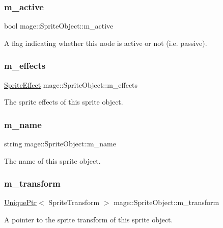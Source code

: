 \subsubsection{\texorpdfstring{m\+\_\+active}{m\_active}}
{\footnotesize\ttfamily bool mage\+::\+Sprite\+Object\+::m\+\_\+active\hspace{0.3cm}{\ttfamily [private]}}

A flag indicating whether this node is active or not (i.\+e. passive). \hypertarget{classmage_1_1_sprite_object_a270f73b8d316f72c4228854d08a6d2ea}{}\label{classmage_1_1_sprite_object_a270f73b8d316f72c4228854d08a6d2ea} 
\subsubsection{\texorpdfstring{m\+\_\+effects}{m\_effects}}
{\footnotesize\ttfamily \hyperlink{namespacemage_a9cfe18123066ba4236f548f9de75d881}{Sprite\+Effect} mage\+::\+Sprite\+Object\+::m\+\_\+effects\hspace{0.3cm}{\ttfamily [private]}}

The sprite effects of this sprite object. \hypertarget{classmage_1_1_sprite_object_a6f2a859e40ed391909bb4c87a8b74480}{}\label{classmage_1_1_sprite_object_a6f2a859e40ed391909bb4c87a8b74480} 
\subsubsection{\texorpdfstring{m\+\_\+name}{m\_name}}
{\footnotesize\ttfamily string mage\+::\+Sprite\+Object\+::m\+\_\+name\hspace{0.3cm}{\ttfamily [private]}}

The name of this sprite object. \hypertarget{classmage_1_1_sprite_object_a9523ae6f081a8fde3cbb3558f6e327da}{}\label{classmage_1_1_sprite_object_a9523ae6f081a8fde3cbb3558f6e327da} 
\subsubsection{\texorpdfstring{m\+\_\+transform}{m\_transform}}
{\footnotesize\ttfamily \hyperlink{namespacemage_a8c307fbcc33bce9b7f2aa4c26c3b95cf}{Unique\+Ptr}$<$ Sprite\+Transform $>$ mage\+::\+Sprite\+Object\+::m\+\_\+transform\hspace{0.3cm}{\ttfamily [private]}}

A pointer to the sprite transform of this sprite object. 